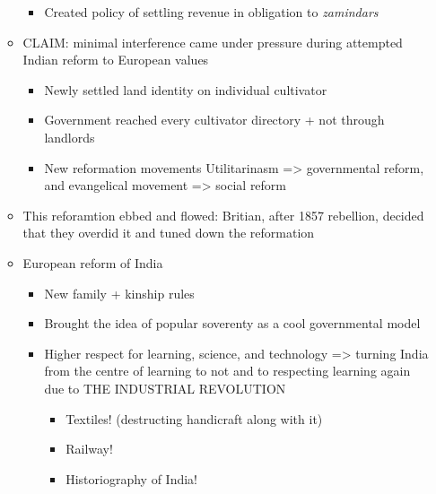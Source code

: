 \documentclass[letterpaper]{article}
\begin{document}
\begin{itemize}
\begin{itemize}
\begin{itemize}
\item Created policy of settling revenue in obligation to \emph{zamindars}
\end{itemize}

\item CLAIM: minimal interference came under pressure during attempted
Indian reform to European values

\begin{itemize}
\item Newly settled land identity on individual cultivator
\item Government reached every cultivator directory + not through
landlords
\item New reformation movements Utilitarinasm => governmental reform,
and evangelical movement => social reform
\end{itemize}

\item This reforamtion ebbed and flowed: Britian, after 1857 rebellion,
decided that they overdid it and tuned down the reformation
\item European reform of India

\begin{itemize}
\item New family + kinship rules
\item Brought the idea of popular soverenty as a cool governmental model
\item Higher respect for learning, science, and technology => turning
India from the centre of learning to not and to respecting
learning again due to THE INDUSTRIAL REVOLUTION

\begin{itemize}
\item Textiles! (destructing handicraft along with it)
\item Railway!
\item Historiography of India!
\end{itemize}
\end{itemize}
\end{itemize}
\end{itemize}
\end{document}
